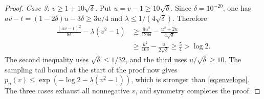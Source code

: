 \documentclass[11pt,reqno]{amsart}
\begin{document}
\begin{proof}
\medskip
\noindent\emph{Case 3: $v\ge1+10\sqrt\delta$.}
Put $u=v-1\ge10\sqrt\delta$. Since $\delta=10^{-20}$,
one has $av-t=(1-2\delta)u-3\delta\ge3u/4$ and
$\lambda\le1/(4\sqrt\delta)$. Therefore
\[
\begin{aligned}
    \frac{(av-t)^2}{8\delta}-\lambda(v^2-1)
    &\ge\frac{9u^2}{128\delta}
         -\frac{u^2+2u}{4\sqrt\delta}\\
    &\ge\frac{u^2}{16\delta}-\frac{u}{2\sqrt\delta}
     \ge\frac54>\log2.
\end{aligned}
\]
The second inequality uses $\sqrt\delta\le1/32$, and the third
uses $u/\sqrt\delta\ge10$. The sampling tail bound at the start
of the proof now gives
$p_n(v)\le\exp(-\log2-\lambda(v^2-1))$, which is stronger than
\eqref{eq:envelope}. The three cases exhaust all nonnegative $v$,
and symmetry completes the proof.
\end{proof}



\end{document}
